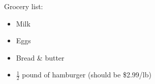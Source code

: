 \documentclass{article}
\begin{document}
\begin{center}      %
    Grocery list:
\end{center}

\begin{itemize}      %
    \item Milk       %
    \item Eggs
    \item Bread \& butter      %
    \item $\frac{1}{2}$ pound of hamburger (should be \$2.99/lb)
\end{itemize}
\end{document}
